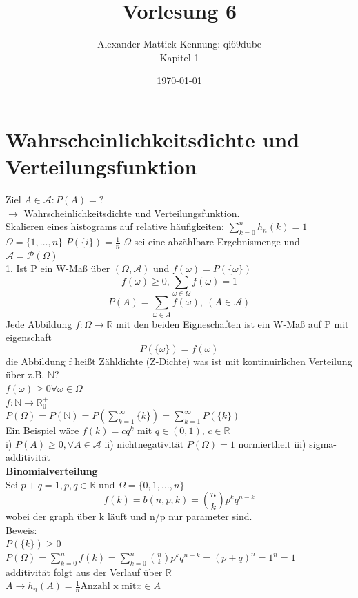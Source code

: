 \documentclass{article}
\author{
Alexander Mattick Kennung: qi69dube\\
Kapitel 1
}
\date{\today}
\title{Vorlesung 6}
\begin{document}
	\maketitle
	\section{Wahrscheinlichkeitsdichte und Verteilungsfunktion}
	Ziel $A\in\mathcal{A}: P(A)=?$\\
	$\to$ Wahrscheinlichkeitsdichte und Verteilungsfunktion.\\
	Skalieren eines histograms auf relative häufigkeiten: $\sum\limits^n_{k=0} h_n(k)=1$\\
	$\Omega =\{1,\dots,n\}$ $P(\{i\})=\frac{1}{n}$
	$\Omega$ sei eine abzählbare Ergebnismenge und $\mathcal{A}=\mathcal{P}(\Omega)$\\
	1. Ist P ein W-Maß über $(\Omega,\mathcal{A})$ und $f(\omega)=P(\{\omega\})$\\
	\[f(\omega)\geq 0, \sum\limits_{\omega\in\Omega} f(\omega)=1\]
	\[P(A)=\sum\limits_{\omega\in A}f(\omega),\ (A\in\mathcal{A})\]
	Jede Abbildung $f:\Omega\to \mathbb{R}$ mit den beiden Eigneschaften ist ein W-Maß auf P mit eigenschaft
	\[P(\{\omega\})=f(\omega)\]
	die Abbildung f heißt Zähldichte (Z-Dichte)
	was ist mit kontinuirlichen Verteilung über z.B. $\mathbb{N}$?\\
	$f(\omega)\geq 0\forall \omega\in\Omega$\\
	$f:\mathbb{N}\to \mathbb{R}^+_0$\\
	$P(\Omega)=P(\mathbb{N})=P(\sum\limits^\infty_{k=1}\{k\})=\sum\limits^\infty_{k=1}P(\{k\})$\\
	Ein Beispiel wäre $f(k)=cq^k$ mit $q\in(0,1)$, $c\in\mathbb{R}$\\
	i) $P(A)\geq 0,\forall A\in\mathcal{A}$ ii) nichtnegativität $P(\Omega)=1$ normiertheit iii) sigma-additivität\\
	\textbf{Binomialverteilung}\\
	Sei $p+q=1, p,q\in\mathbb{R}$ und $\Omega = \{0,1,\dots, n\}$
	\[f(k)=b(n,p;k)=\binom{n}{k} p^kq^{n-k}\]
	wobei der graph über k läuft und n/p nur parameter sind.\\
	Beweis:\\
	$P(\{k\})\geq 0$
	$P(\Omega) = \sum\limits^n_{k=0}f(k) = \sum\limits^n_{k=0}\binom{n}{k}p^kq^{n-k}=(p+q)^n=1^n=1$\\
	additivität folgt aus der Verlauf über $\mathbb{R}$\\
	$A\to h_n(A) = \frac{1}{n} \text{Anzahl x mit} x\in A$\\
\end{document}
